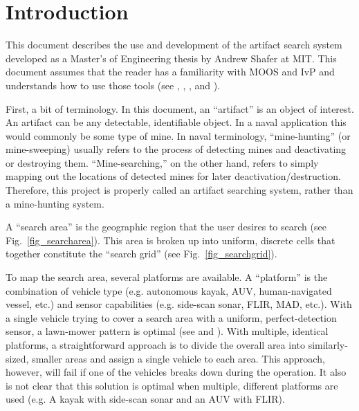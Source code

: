 \section{Introduction}
\label{intro}

This document describes the use and development of the artifact search system developed as a Master's of Engineering thesis by Andrew Shafer at MIT.  This document assumes that the reader has a familiarity with MOOS and IvP and understands how to use those tools (see \cite{new03}, \cite{ben02a}, \cite{ben03}, and \cite{ben04b}).

First, a bit of terminology.  In this document, an ``artifact'' is an object of interest.  An artifact can be any detectable, identifiable object.  In a naval application this would commonly be some type of mine.  In naval terminology, ``mine-hunting'' (or mine-sweeping) usually refers to the process of detecting mines and deactivating or destroying them.  ``Mine-searching,'' on the other hand, refers to simply mapping out the locations of detected mines for later deactivation/destruction.  Therefore, this project is properly called an artifact searching system, rather than a mine-hunting system.

A ``search area'' is the geographic region that the user desires to search (see Fig.~\ref{fig_searcharea}).  This area is broken up into uniform, discrete cells that together constitute the ``search grid'' (see Fig.~\ref{fig_searchgrid}).



To map the search area, several platforms are available.  A ``platform'' is the combination of vehicle type (e.g. autonomous kayak, AUV, human-navigated vessel, etc.) and sensor capabilities (e.g. side-scan sonar, FLIR, MAD, etc.).  With a single vehicle trying to cover a search area with a uniform, perfect-detection sensor, a lawn-mower pattern is optimal (see \cite{choset01} and \cite{choset03}).  With multiple, identical platforms, a straightforward approach is to divide the overall area into similarly-sized, smaller areas and assign a single vehicle to each area.  This approach, however, will fail if one of the vehicles breaks down during the operation.  It also is not clear that this solution is optimal when multiple, different platforms are used (e.g. A kayak with side-scan sonar and an AUV with FLIR).

